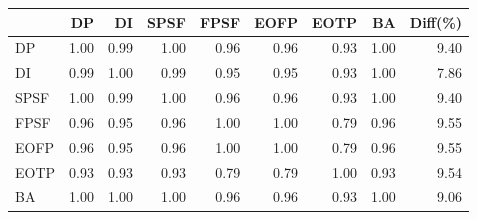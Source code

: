 \begin{tabular}{l|rrrrrrr|r}
\toprule
 & DP & DI & SPSF & FPSF & EOFP & EOTP & BA & Diff(\%)  \\
\midrule
DP & 1.00 & 0.99 & 1.00 & 0.96 & 0.96 & 0.93 & 1.00 & 9.40  \\
DI & 0.99 & 1.00 & 0.99 & 0.95 & 0.95 & 0.93 & 1.00 & 7.86  \\
SPSF & 1.00 & 0.99 & 1.00 & 0.96 & 0.96 & 0.93 & 1.00 & 9.40  \\
FPSF & 0.96 & 0.95 & 0.96 & 1.00 & 1.00 & 0.79 & 0.96 & 9.55  \\
EOFP & 0.96 & 0.95 & 0.96 & 1.00 & 1.00 & 0.79 & 0.96 & 9.55  \\
EOTP & 0.93 & 0.93 & 0.93 & 0.79 & 0.79 & 1.00 & 0.93 & 9.54  \\
BA & 1.00 & 1.00 & 1.00 & 0.96 & 0.96 & 0.93 & 1.00 & 9.06  \\
\bottomrule
\end{tabular}

